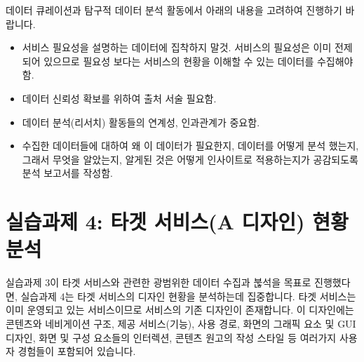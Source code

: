 \documentclass[
  letterpaper,
]{book}
\providecommand{\tightlist}{%
  \setlength{\itemsep}{0pt}\setlength{\parskip}{0pt}}\usepackage{longtable,booktabs,array}
\begin{document}
데이터 큐레이션과 탐구적 데이터 분석 활동에서 아래의 내용을 고려하여
진행하기 바랍니다.

\begin{itemize}
\tightlist
\item
  서비스 필요성을 설명하는 데이터에 집착하지 말것. 서비스의 필요성은
  이미 전제되어 있으므로 필요성 보다는 서비스의 현황을 이해할 수 있는
  데이터를 수집해야함.
\item
  데이터 신뢰성 확보를 위하여 출처 서술 필요함.
\item
  데이터 분석(리서치) 활동들의 연계성, 인과관계가 중요함.
\item
  수집한 데이터들에 대하여 왜 이 데이터가 필요한지, 데이터를 어떻게 분석
  했는지, 그래서 무엇을 알았는지, 알게된 것은 어떻게 인사이트로
  적용하는지가 공감되도록 분석 보고서를 작성함.
\end{itemize}

\section{실습과제 4: 타겟 서비스(A 디자인) 현황
분석}\label{uxc2e4uxc2b5uxacfcuxc81c-4-uxd0c0uxac9f-uxc11cuxbe44uxc2a4a-uxb514uxc790uxc778-uxd604uxd669-uxbd84uxc11d}

실습과제 3이 타겟 서비스와 관련한 광범위한 데이터 수집과 붆석을 목표로
진행했다면, 실습과제 4는 타겟 서비스의 디자인 현황을 분석하는데
집중합니다. 타겟 서비스는 이미 운영되고 있는 서비스이므로 서비스의 기존
디자인이 존재합니다. 이 디자인에는 콘텐츠와 네비게이션 구조, 제공
서비스(기능), 사용 경로, 화면의 그래픽 요소 및 GUI 디자인, 화면 및 구성
요소들의 인터렉션, 콘텐츠 원고의 작성 스타일 등 여러가지 사용자 경험들이
포함되어 있습니다.
\end{document}
